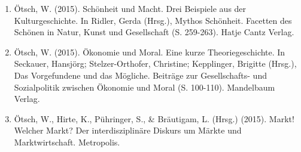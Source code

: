 \begin{enumerate}
	 \item Ötsch, W. (2015). Schönheit und Macht. Drei Beispiele aus der Kulturgeschichte. In Ridler, Gerda (Hrsg.), Mythos Schönheit. Facetten des Schönen in Natur, Kunst und Gesellschaft (S. 259-263). Hatje Cantz Verlag.
	 \item Ötsch, W. (2015). Ökonomie und Moral. Eine kurze Theoriegeschichte. In Seckauer, Hansjörg; Stelzer-Orthofer, Christine; Kepplinger, Brigitte (Hrsg.), Das Vorgefundene und das Mögliche. Beiträge zur Gesellschafts- und Sozialpolitik zwischen Ökonomie und Moral (S. 100-110). Mandelbaum Verlag.
	 \item Ötsch, W., Hirte, K., Pühringer, S., \& Bräutigam, L. (Hrsg.) (2015). Markt! Welcher Markt? Der interdisziplinäre Diskurs um Märkte und Marktwirtschaft. Metropolis.
\end{enumerate}
